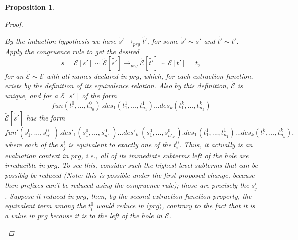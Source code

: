 \documentclass[11pt]{article} %
\newtheorem{proposition}{Proposition}
\begin{document}
\begin{proposition}
\begin{proof}
\begin{enumerate}
By the induction hypothesis we have $\widetilde{s'} \longrightarrow_{prg} \widetilde{t'}$, for some $\widetilde{s'} \sim s'$ and $\widetilde{t'} \sim t'$. Apply the congruence rule to get the desired
\begin{equation*}
s = \mathcal{E}[s'] \sim \widetilde{\mathcal{E}}[\widetilde{s'}] \longrightarrow_{prg} \widetilde{\mathcal{E}}[\widetilde{t'}] \sim \mathcal{E}[t'] = t,
\end{equation*}
for an $\widetilde{\mathcal{E}} \sim \mathcal{E}$ with all names declared in $prg$, which, for each extraction function, exists by the definition of its equivalence relation. Also by this definition, $\widetilde{\mathcal{E}}$ is unique, and for a $\mathcal{E}[s']$ of the form
\begin{equation*}
fun(t^0_1, ..., t^0_{n_0}).des_1(t^1_1, ..., t^1_{n_1})...des_k(t^k_1, ..., t^k_{n_k})
\end{equation*}
$\widetilde{\mathcal{E}}[\widetilde{s'}]$ has the form
\begin{equation*}
fun'(s^0_1, ..., s^0_{n'_0}).des'_1(s^0_1, ..., s^0_{n'_1})...des'_{k'}(s^0_1, ..., s^0_{n'_{k'}}).des_1(t^1_1, ..., t^1_{n_1})...des_k(t^k_1, ..., t^k_{n_k}),
\end{equation*}
where each of the $s^i_j$ is equivalent to exactly one of the $t^0_i$. Thus, it actually is an evaluation context in $prg$, i.e., all of its immediate subterms left of the hole are irreducible in $prg$. To see this, consider such the highest-level subterms that can be possibly be reduced (Note: this is possible under the first proposed change, because then prefixes can't be reduced using the congruence rule); those are precisely the $s^i_j$. Suppose it reduced in $prg$, then, by the second extraction function property, the equivalent term among the $t^0_i$ would reduce in $\langle prg \rangle$, contrary to the fact that it is a value in $prg$ because it is to the left of the hole in $\mathcal{E}$.

\end{enumerate}

\end{proof}

\end{proposition}

\end{document}
